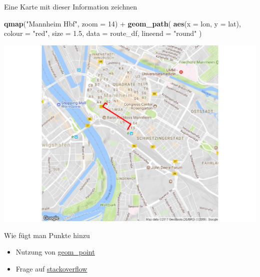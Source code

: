 \documentclass[ignorenonframetext,]{beamer}
\newenvironment{Shaded}{}{}
\newcommand{\KeywordTok}[1]{\textcolor[rgb]{0.00,0.44,0.13}{\textbf{{#1}}}}
\newcommand{\DataTypeTok}[1]{\textcolor[rgb]{0.56,0.13,0.00}{{#1}}}
\newcommand{\DecValTok}[1]{\textcolor[rgb]{0.25,0.63,0.44}{{#1}}}
\newcommand{\FloatTok}[1]{\textcolor[rgb]{0.25,0.63,0.44}{{#1}}}
\newcommand{\StringTok}[1]{\textcolor[rgb]{0.25,0.44,0.63}{{#1}}}
\newcommand{\NormalTok}[1]{{#1}}
\begin{document}
\begin{frame}[fragile]{Eine Karte mit dieser Information zeichnen}

\begin{Shaded}
\begin{Highlighting}[]
\KeywordTok{qmap}\NormalTok{(}\StringTok{"Mannheim Hbf"}\NormalTok{, }\DataTypeTok{zoom =} \DecValTok{14}\NormalTok{) +}
\StringTok{  }\KeywordTok{geom_path}\NormalTok{(}
    \KeywordTok{aes}\NormalTok{(}\DataTypeTok{x =} \NormalTok{lon, }\DataTypeTok{y =} \NormalTok{lat),  }\DataTypeTok{colour =} \StringTok{"red"}\NormalTok{, }\DataTypeTok{size =} \FloatTok{1.5}\NormalTok{,}
    \DataTypeTok{data =} \NormalTok{route_df, }\DataTypeTok{lineend =} \StringTok{"round"}
  \NormalTok{)}
\end{Highlighting}
\end{Shaded}

\includegraphics{R_intern_files/figure-beamer/unnamed-chunk-290-1.pdf}

Wie fügt man Punkte hinzu

\begin{itemize}
\item
  Nutzung von
  \href{http://zevross.com/blog/2014/07/16/mapping-in-r-using-the-ggplot2-package/}{geom\_point}
\item
  Frage auf
  \href{http://stackoverflow.com/questions/15069963/getting-a-map-with-points-using-ggmap-and-ggplot2}{stackoverflow}
\end{itemize}

\end{frame}
\end{document}
